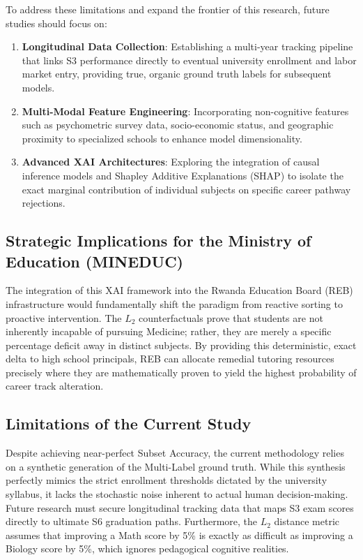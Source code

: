 To address these limitations and expand the frontier of this research, future studies should focus on:
\begin{enumerate}
    \item \textbf{Longitudinal Data Collection}: Establishing a multi-year tracking pipeline that links S3 performance directly to eventual university enrollment and labor market entry, providing true, organic ground truth labels for subsequent models.
    \item \textbf{Multi-Modal Feature Engineering}: Incorporating non-cognitive features such as psychometric survey data, socio-economic status, and geographic proximity to specialized schools to enhance model dimensionality.
    \item \textbf{Advanced XAI Architectures}: Exploring the integration of causal inference models and Shapley Additive Explanations (SHAP) to isolate the exact marginal contribution of individual subjects on specific career pathway rejections.
\end{enumerate}


\subsection{Strategic Implications for the Ministry of Education (MINEDUC)}
The integration of this XAI framework into the Rwanda Education Board (REB) infrastructure would fundamentally shift the paradigm from reactive sorting to proactive intervention. The $L_2$ counterfactuals prove that students are not inherently incapable of pursuing Medicine; rather, they are merely a specific percentage deficit away in distinct subjects. By providing this deterministic, exact delta to high school principals, REB can allocate remedial tutoring resources precisely where they are mathematically proven to yield the highest probability of career track alteration.

\subsection{Limitations of the Current Study}
Despite achieving near-perfect Subset Accuracy, the current methodology relies on a synthetic generation of the Multi-Label \parencite{tsoumakas2007multi} ground truth. While this synthesis perfectly mimics the strict enrollment thresholds dictated by the university syllabus, it lacks the stochastic noise inherent to actual human decision-making. Future research must secure longitudinal tracking data that maps S3 exam scores directly to ultimate S6 graduation paths. Furthermore, the $L_2$ distance metric assumes that improving a Math score by 5\% is exactly as difficult as improving a Biology score by 5\%, which ignores pedagogical cognitive realities.

